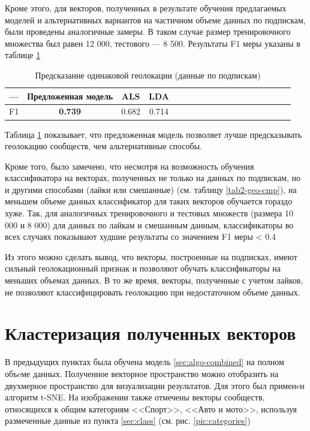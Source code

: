 \documentclass[times,specification,annotation]{itmo-student-thesis}
\begin{document}
Кроме этого, для векторов, полученных в результате обучения предлагаемых моделей и альтернативных вариантов на частичном объеме данных по подпискам, были проведены аналогичные замеры. В таком случае размер тренировочного множества был равен 12 000, тестового --- 8 500. Результаты F1 меры указаны в таблице \ref{tab2-geo-all}

\begin{table}[!h]
\caption{Предсказание одинаковой геолокации (данные по подпискам)} \label{tab2-geo-all}
\centering
\begin{tabular}{|*{18}{c|}}\hline
---  & Предложенная модель  & ALS & LDA \\\hline
F1                        & \textbf{0.739} & 0.682  & 0.714 \\\hline
\end{tabular}
\end{table}

Таблица \ref{tab2-geo-all} показывает, что предложенная модель позволяет лучше предсказывать геолокацию сообществ, чем альтернативные способы. 

Кроме того, было замечено, что несмотря на возможность обучения классификатора на векторах, полученных не только на данных по подпискам, но и другими способами (лайки или смешанные) (см. таблицу \ref{tab2-geo-cmp}), на меньшем объеме данных классификатор для таких векторов обучается гораздо хуже. Так, для аналогичных тренировочного и тестовых множеств (размера 10 000 и 8 000) для данных по лайкам и смешанным данным, классификаторы во всех случаях показывают худшие результаты со значением F1 меры < 0.4

Из этого можно сделать вывод, что векторы, построенные на подписках, имеют сильный геолокационный признак и позволяют обучать классификаторы на меньших объемах данных. В то же время, векторы, полученные с учетом лайков, не позволяют классифицировать геолокацию при недостаточном объеме данных.   

\section{Кластеризация полученных векторов}\label{sec:visual}

В предыдущих пунктах была обучена модель \ref{sec:algo-combined} на полном объeме данных. Полученное векторное пространство можно отобразить на двухмерное пространство для визуализации результатов. Для этого был применeн алгоритм t-SNE. На изображении также отмечены векторы сообществ, относящихся к общим категориям <<Спорт>>, <<Авто и мото>>, используя размеченные данные из пункта \ref{sec:class} (см. рис. \ref{pic:categories})
\end{document}
